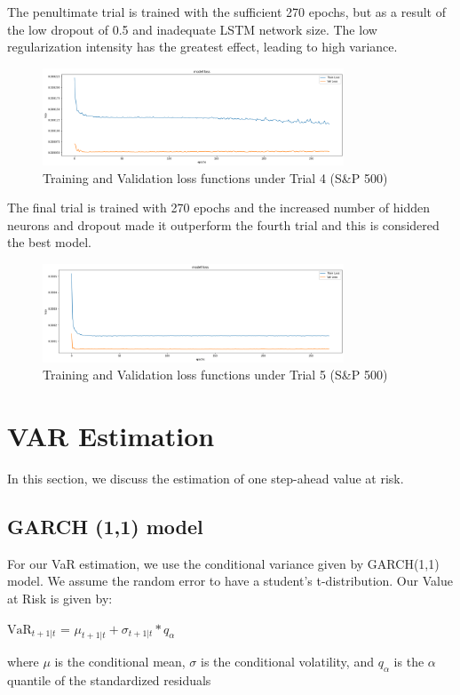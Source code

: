 \documentclass[a4paper,11pt,oneside]{book}
\begin{document}
The penultimate trial is trained with the sufficient 270 epochs, but as a result of the low dropout of 0.5 and inadequate LSTM
network size. The low regularization intensity has the greatest effect, leading to high variance.\newline
\begin{figure}[!h]
	\centering
	\includegraphics[width=0.8\textwidth]{figures/sanp4}
	\caption{Training and Validation loss functions under Trial 4 (S\&P 500)}
	\label{sanp4}
\end{figure}
\newline The final trial is trained with 270 epochs and the increased number of hidden neurons and dropout made it outperform the fourth trial and this is considered the best model.
\begin{figure}[!h]
	\centering
	\includegraphics[width=0.8\textwidth]{figures/sanp5}
	\caption{Training and Validation loss functions under Trial 5 (S\&P 500)}
	\label{sanp5}
\end{figure}\newline\newline\newline\newline\newline

\section{VAR Estimation}
In this section, we discuss the estimation of one step-ahead value at risk.

\subsection{GARCH (1,1) model}

For our VaR estimation, we use the conditional variance given by GARCH(1,1) model. We assume the random error to have a student’s t-distribution. Our Value at Risk is given by:
\begin{center}
$\text{VaR}_{t+1|t}$ = $\mu_{t+1|t} + \sigma_{t+1|t} * q_{\alpha}$
\end{center}
where $\mu$ is the conditional mean, $\sigma$ is the conditional volatility, and $q_{\alpha}$ is the $\alpha$ quantile of the standardized residuals
\end{document}
